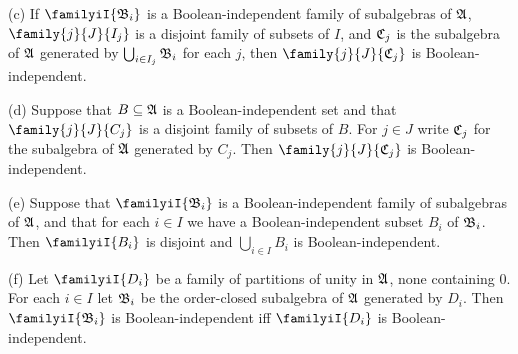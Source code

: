 (c) If $\familyiI{\frak B_i}$ is a Boolean-independent family of
subalgebras of $\frak A$, $\family{j}{J}{I_j}$ is a disjoint family
of subsets of $I$, and $\frak C_j$ is the subalgebra of $\frak A$
generated by $\bigcup_{i\in I_j}\frak B_i$ for each $j$, then
$\family{j}{J}{\frak C_j}$ is Boolean-independent.

(d) Suppose that $B\subseteq\frak A$ is a Boolean-independent set and
that $\family{j}{J}{C_j}$ is a disjoint family of subsets of $B$.   For
$j\in J$ write $\frak C_j$ for the subalgebra of $\frak A$ generated by
$C_j$.   Then $\family{j}{J}{\frak C_j}$ is Boolean-independent.

(e) Suppose that $\familyiI{\frak B_i}$ is a Boolean-independent family
of subalgebras of $\frak A$, and that for each $i\in I$ we have a
Boolean-independent subset $B_i$ of $\frak B_i$.   Then $\familyiI{B_i}$
is disjoint and $\bigcup_{i\in I}B_i$ is Boolean-independent.

(f) Let $\familyiI{D_i}$ be a family of partitions of unity in
$\frak A$, none containing $0$.
For each $i\in I$ let $\frak B_i$ be the order-closed subalgebra of
$\frak A$ generated by $D_i$.   Then
$\familyiI{\frak B_i}$ is Boolean-independent iff $\familyiI{D_i}$ is
Boolean-independent.


